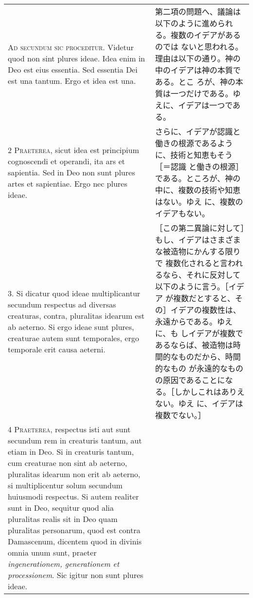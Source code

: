 \documentclass[10pt]{jsarticle} %
\begin{document}
\begin{longtable}{p{21em}p{21em}}


{\huge A}{\scshape d secundum sic proceditur}. Videtur quod
non sint plures ideae. Idea enim in Deo est eius essentia. Sed essentia
Dei est una tantum. Ergo et idea est una.

&

第二項の問題へ、議論は以下のように進められる。複数のイデアがあるのでは
ないと思われる。理由は以下の通り。神の中のイデアは神の本質である。とこ
ろが、神の本質は一つだけである。ゆえに、イデアは一つである。

\\


{\scshape 2 Praeterea}, sicut idea est principium cognoscendi et
operandi, ita ars et sapientia. Sed in Deo non sunt plures artes et
sapientiae. Ergo nec plures ideae.

&

さらに、イデアが認識と働きの根源であるように、技術と知恵もそう［＝認識
と働きの根源］である。ところが、神の中に、複数の技術や知恵はない。ゆえ
に、複数のイデアもない。

\\


3. Si dicatur quod ideae multiplicantur secundum respectus ad diversas
creaturas, contra, pluralitas idearum est ab aeterno. Si ergo ideae
sunt plures, creaturae autem sunt temporales, ergo temporale erit
causa aeterni.

&

［この第二異論に対して］もし、イデアはさまざまな被造物にかんする限りで
 複数化されると言われるなら、それに反対して以下のように言う。［イデア
 が複数だとすると、その］イデアの複数性は、永遠からである。ゆえに、も
 しイデアが複数であるならば、被造物は時間的なものだから、時間的なもの
 が永遠的なものの原因であることになる。［しかしこれはありえない。ゆえ
 に、イデアは複数でない。］

\\


{\scshape 4 Praeterea}, respectus isti aut sunt secundum rem in
creaturis tantum, aut etiam in Deo. Si in creaturis tantum, cum
creaturae non sint ab aeterno, pluralitas idearum non erit ab aeterno,
si multiplicentur solum secundum huiusmodi respectus. Si autem
realiter sunt in Deo, sequitur quod alia pluralitas realis sit in Deo
quam pluralitas personarum, quod est contra Damascenum, dicentem quod
in divinis omnia unum sunt, praeter {\itshape ingenerationem,
generationem et processionem}. Sic igitur non sunt plures ideae.


\end{longtable}
\end{document}
